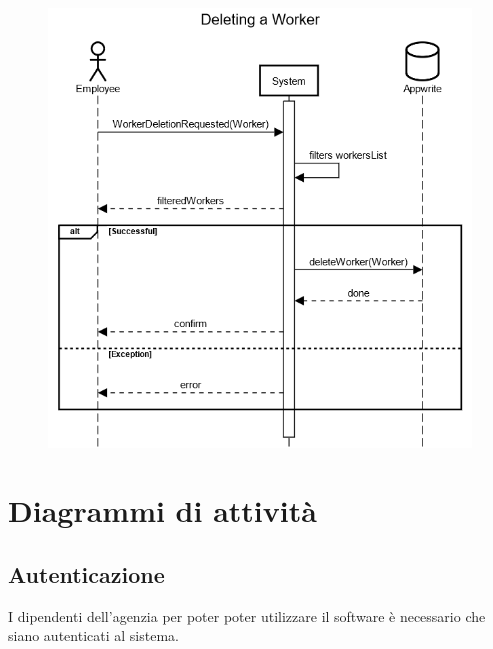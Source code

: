 \documentclass[a4paper, oneside, 12pt]{article}
\begin{document}

\begin{figure}[h!]
	\centering
	\includegraphics[width = 8 cm]{images/rimozione}
	\label{fig:Ricerca lavoratore}
\end{figure}

\newpage
\section{Diagrammi di attività}
\subsection{Autenticazione}
I dipendenti dell'agenzia per poter poter utilizzare il software è necessario che siano autenticati al sistema.
\end{document}

